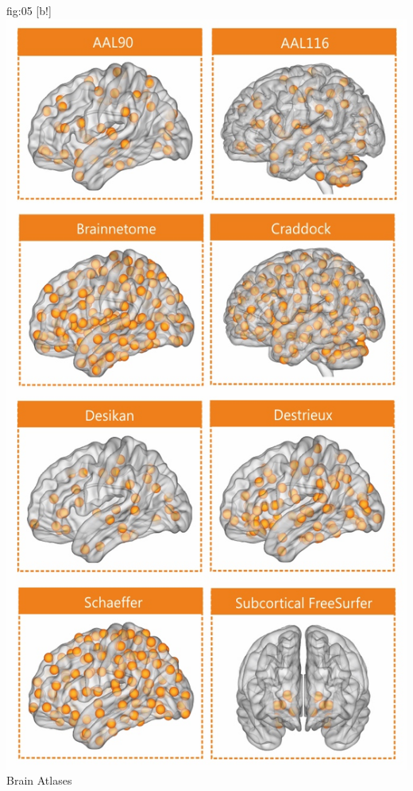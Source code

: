 \documentclass[justified]{tufte-handout}
\begin{document}
	{fig:05}
	{
	[b!]
	\includegraphics{fig05.jpg}
	}
	{Brain Atlases}
\end{document}
